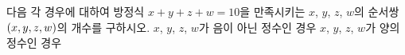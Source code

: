 다음 각 경우에 대하여 방정식 $x+y+z+w=10$을 만족시키는 $x$, $y$, $z$, $w$의 순서쌍 $(x{,}\mkern3mu\mathopen{}y{,}\mkern3mu\mathopen{}z{,}\mkern3mu\mathopen{}w)$의 개수를 구하시오.
 $x$, $y$, $z$, $w$가 음이 아닌 정수인 경우
 $x$, $y$, $z$, $w$가 양의 정수인 경우
